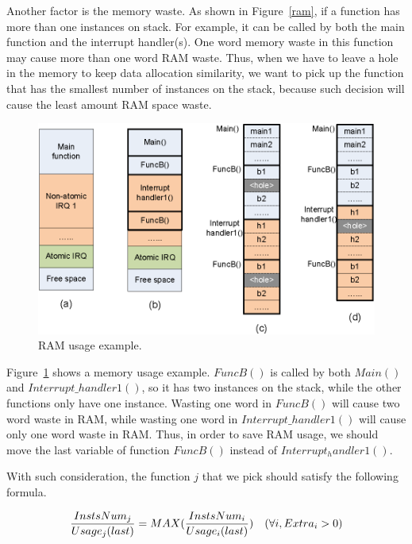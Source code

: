 Another factor is the memory waste. As shown in Figure~\ref{ram}, if a function
has more than one instances on stack. For example, it can be called by both the 
main function and the interrupt handler(s).
One word memory waste in this function may cause 
more than one word RAM waste. Thus, when we have to leave a 
hole in the memory to keep data allocation similarity, we want to
pick up the function that has the smallest number of instances
on the stack, because such decision will cause the least amount
RAM space waste.

\begin{figure}[h]
\centering
\includegraphics[width=4.5in]{figures/stack.eps}
\caption{RAM usage example.}
\label{stack}
\end{figure}
Figure~\ref{stack} shows a memory usage example. 
$FuncB()$ is called by both $Main()$ and $Interrupt\_handler1()$, so
it has two instances on the stack, while the other functions only
have one instance. Wasting one word in $FuncB()$ will cause two word
waste in RAM, while wasting one word in $Interrupt\_handler1()$ will
cause only one word waste in RAM. Thus, in order to save RAM usage, we should
move the last variable of function $FuncB()$ instead of $Interrupt_handler1()$.



With such consideration, the function $j$ that we pick should satisfy the following
formula.
\begin{small}
\begin{eqnarray}
{{InstsNum_j}\over{Usage_j(last)}} = MAX( {{InstsNum_i}\over{Usage_i(last)}} )~~~ {(\forall i, Extra_i>0)}
\label{factor}
\end{eqnarray}
\end{small}

